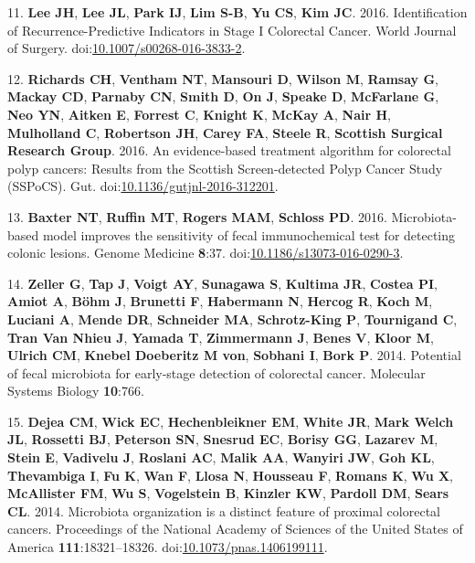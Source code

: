 \documentclass[12pt,]{article}
\begin{document}
\hypertarget{ref-lee_identification_2016}{}
11. \textbf{Lee JH}, \textbf{Lee JL}, \textbf{Park IJ}, \textbf{Lim
S-B}, \textbf{Yu CS}, \textbf{Kim JC}. 2016. Identification of
Recurrence-Predictive Indicators in Stage I Colorectal Cancer. World
Journal of Surgery.
doi:\href{https://doi.org/10.1007/s00268-016-3833-2}{10.1007/s00268-016-3833-2}.

\hypertarget{ref-richards_evidence-based_2016}{}
12. \textbf{Richards CH}, \textbf{Ventham NT}, \textbf{Mansouri D},
\textbf{Wilson M}, \textbf{Ramsay G}, \textbf{Mackay CD},
\textbf{Parnaby CN}, \textbf{Smith D}, \textbf{On J}, \textbf{Speake D},
\textbf{McFarlane G}, \textbf{Neo YN}, \textbf{Aitken E},
\textbf{Forrest C}, \textbf{Knight K}, \textbf{McKay A}, \textbf{Nair
H}, \textbf{Mulholland C}, \textbf{Robertson JH}, \textbf{Carey FA},
\textbf{Steele R}, \textbf{Scottish Surgical Research Group}. 2016. An
evidence-based treatment algorithm for colorectal polyp cancers: Results
from the Scottish Screen-detected Polyp Cancer Study (SSPoCS). Gut.
doi:\href{https://doi.org/10.1136/gutjnl-2016-312201}{10.1136/gutjnl-2016-312201}.

\hypertarget{ref-baxter_microbiota-based_2016}{}
13. \textbf{Baxter NT}, \textbf{Ruffin MT}, \textbf{Rogers MAM},
\textbf{Schloss PD}. 2016. Microbiota-based model improves the
sensitivity of fecal immunochemical test for detecting colonic lesions.
Genome Medicine \textbf{8}:37.
doi:\href{https://doi.org/10.1186/s13073-016-0290-3}{10.1186/s13073-016-0290-3}.

\hypertarget{ref-zeller_potential_2014}{}
14. \textbf{Zeller G}, \textbf{Tap J}, \textbf{Voigt AY},
\textbf{Sunagawa S}, \textbf{Kultima JR}, \textbf{Costea PI},
\textbf{Amiot A}, \textbf{Böhm J}, \textbf{Brunetti F},
\textbf{Habermann N}, \textbf{Hercog R}, \textbf{Koch M},
\textbf{Luciani A}, \textbf{Mende DR}, \textbf{Schneider MA},
\textbf{Schrotz-King P}, \textbf{Tournigand C}, \textbf{Tran Van Nhieu
J}, \textbf{Yamada T}, \textbf{Zimmermann J}, \textbf{Benes V},
\textbf{Kloor M}, \textbf{Ulrich CM}, \textbf{Knebel Doeberitz M von},
\textbf{Sobhani I}, \textbf{Bork P}. 2014. Potential of fecal microbiota
for early-stage detection of colorectal cancer. Molecular Systems
Biology \textbf{10}:766.

\hypertarget{ref-dejea_microbiota_2014}{}
15. \textbf{Dejea CM}, \textbf{Wick EC}, \textbf{Hechenbleikner EM},
\textbf{White JR}, \textbf{Mark Welch JL}, \textbf{Rossetti BJ},
\textbf{Peterson SN}, \textbf{Snesrud EC}, \textbf{Borisy GG},
\textbf{Lazarev M}, \textbf{Stein E}, \textbf{Vadivelu J},
\textbf{Roslani AC}, \textbf{Malik AA}, \textbf{Wanyiri JW}, \textbf{Goh
KL}, \textbf{Thevambiga I}, \textbf{Fu K}, \textbf{Wan F}, \textbf{Llosa
N}, \textbf{Housseau F}, \textbf{Romans K}, \textbf{Wu X},
\textbf{McAllister FM}, \textbf{Wu S}, \textbf{Vogelstein B},
\textbf{Kinzler KW}, \textbf{Pardoll DM}, \textbf{Sears CL}. 2014.
Microbiota organization is a distinct feature of proximal colorectal
cancers. Proceedings of the National Academy of Sciences of the United
States of America \textbf{111}:18321--18326.
doi:\href{https://doi.org/10.1073/pnas.1406199111}{10.1073/pnas.1406199111}.
\end{document}
